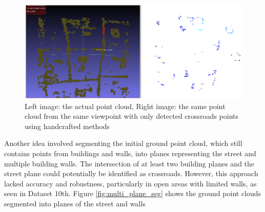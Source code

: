 \documentclass[11pt]{article}
\begin{document}
    \begin{figure}
    \centering
    \includegraphics[width=\textwidth,height=\textheight,keepaspectratio]{images/experiment/crossroads_det_1}
    \caption{
        Left image: the actual point cloud,
        Right image: the same point cloud from the same viewpoint with only detected crossroads points using handcrafted methods
    }
    \label{fig:crossroads_det_1}
    \end{figure}

    Another idea involved segmenting the initial ground point cloud, which still contains points from buildings
    and walls, into planes representing the street and multiple building walls. The intersection of at least two building planes
    and the street plane could potentially be identified as crossroads. However, this approach lacked accuracy and
    robustness, particularly in open areas with limited walls, as seen in Dataset 10th. Figure \ref{fig:multi_plane_seg} shows
    the ground point clouds segmented into planes of the street and walls
\end{document}
